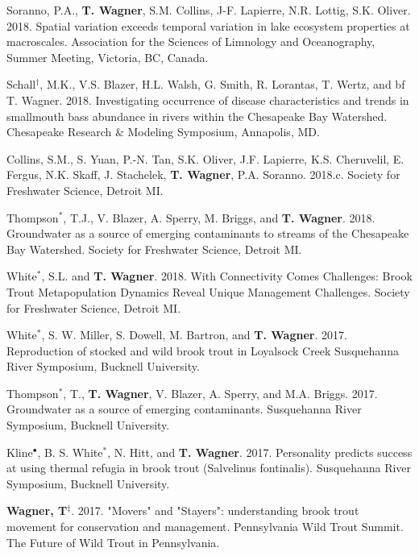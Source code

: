 \documentclass[10pt]{article}
\begin{document}
\begin{flushleft}
\begin{etaremune}
\item Soranno, P.A., {\bf T. Wagner}, S.M. Collins, J-F. Lapierre, N.R. Lottig, S.K. Oliver. 2018. Spatial variation exceeds temporal variation in lake ecosystem properties at macroscales. Association for the Sciences of Limnology and Oceanography, Summer Meeting, Victoria, BC, Canada.

\item Schall$^\dagger$, M.K., V.S. Blazer, H.L. Walsh, G. Smith, R. Lorantas, T. Wertz, and {bf T. Wagner}. 2018. Investigating occurrence of disease characteristics and trends in smallmouth bass abundance in rivers within the Chesapeake Bay Watershed. Chesapeake Research \& Modeling Symposium, Annapolis, MD.

\item Collins, S.M., S. Yuan, P.-N. Tan, S.K. Oliver, J.F. Lapierre, K.S. Cheruvelil, E. Fergus, N.K. Skaff, J. Stachelek, {\bf T. Wagner}, P.A. Soranno. 2018.c. Society for Freshwater Science, Detroit MI.

\item Thompson$^*$, T.J., V. Blazer, A. Sperry, M. Briggs, and {\bf T. Wagner}. 2018. Groundwater as a source of emerging contaminants to streams of the Chesapeake Bay Watershed. Society for Freshwater Science, Detroit MI.

\item White$^*$, S.L. and {\bf T. Wagner}. 2018. With Connectivity Comes Challenges: Brook Trout Metapopulation Dynamics Reveal Unique Management Challenges. Society for Freshwater Science, Detroit MI.

\item White$^*$, S. W. Miller, S. Dowell, M. Bartron, and {\bf T. Wagner}. 2017. Reproduction of stocked and wild brook trout in Loyalsock Creek  Susquehanna River Symposium, Bucknell University.

\item Thompson$^*$, T., {\bf T. Wagner}, V. Blazer, A. Sperry, and M.A. Briggs. 2017. Groundwater as a source of emerging contaminants. Susquehanna River Symposium, Bucknell University.

\item Kline$^\bullet$, B. S. White$^*$, N. Hitt, and {\bf T. Wagner}. 2017. Personality predicts success at using thermal refugia in brook trout (Salvelinus fontinalis). Susquehanna River Symposium, Bucknell University.

\item {\bf Wagner, T}$^\ddagger$. 2017. "Movers" and "Stayers": understanding brook trout movement for conservation and management. Pennsylvania Wild Trout Summit. The Future of Wild Trout in Pennsylvania.


\end{etaremune}
\end{flushleft}
\end{document}

